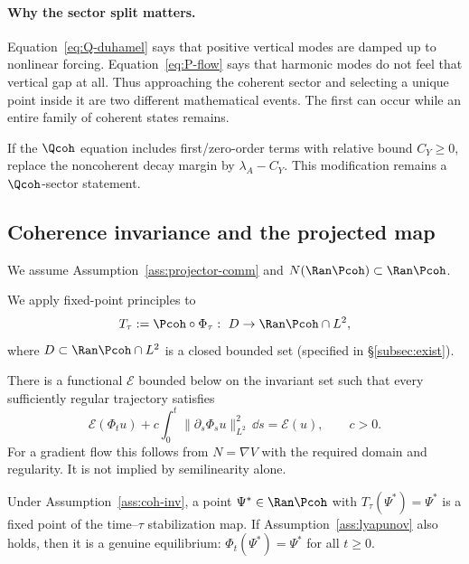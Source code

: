 \documentclass[11pt]{article}
\newcommand{\Aop}{A}
\newcommand{\Ltwo}{\ensuremath{L^{2}}}
\begin{document}
\paragraph{Why the sector split matters.}
Equation~\eqref{eq:Q-duhamel} says that positive vertical modes are damped up
to nonlinear forcing.  Equation~\eqref{eq:P-flow} says that harmonic modes do
not feel that vertical gap at all.  Thus approaching the coherent sector and
selecting a unique point inside it are two different mathematical events.
The first can occur while an entire family of coherent states remains.

\begin{remark}
If the $\Qcoh$ equation includes first/zero-order terms with relative bound
$C_Y\ge0$, replace the noncoherent decay margin by
$\lambda_{\Aop}-C_Y$. This modification remains a $\Qcoh$-sector statement.
\end{remark}

\subsection{Coherence invariance and the projected map}
\begin{assumption}\label{ass:coh-inv}
We assume Assumption~\ref{ass:projector-comm} and
$N(\Ran\Pcoh)\subset \Ran\Pcoh$.
\end{assumption}

We apply fixed-point principles to
\[
T_\tau := \Pcoh\circ \Phi_\tau:\ D\to \Ran\Pcoh\cap \Ltwo,
\]
where $D\subset \Ran\Pcoh\cap \Ltwo$ is a closed bounded set (specified in
\S\ref{subsec:exist}).

\begin{assumption}\label{ass:lyapunov}
There is a functional $\mathcal E$ bounded below on the invariant set such that
every sufficiently regular trajectory satisfies
\[
\mathcal E(\Phi_tu)+c\int_0^t\|\partial_s\Phi_su\|_{\Ltwo}^2\,\dd s
=\mathcal E(u),\qquad c>0.
\]
For a gradient flow this follows from $N=\nabla V$ with the required domain and
regularity. It is not implied by semilinearity alone.
\end{assumption}

\begin{corollary}\label{prop:proj-eq}
Under Assumption~\ref{ass:coh-inv}, a point
$\Psi^\ast\in\Ran\Pcoh$ with $T_\tau(\Psi^\ast)=\Psi^\ast$ is a fixed point of
the time--$\tau$ stabilization map. If Assumption~\ref{ass:lyapunov} also holds,
then it is a genuine equilibrium:
$\Phi_t(\Psi^\ast)=\Psi^\ast$ for all $t\ge0$.
\end{corollary}
\end{document}
